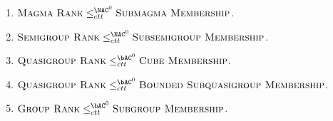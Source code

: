 \documentclass{article}
\begin{document}
\begin{lemma}\label{lem:ranktomem}
  \mbox{}
  \begin{enumerate}
  \item $\textsc{Magma Rank} \leq^{\NAC^0}_{ctt} \textsc{Submagma Membership}$.
  \item $\textsc{Semigroup Rank} \leq^{\NAC^0}_{ctt} \textsc{Subsemigroup Membership}$.
  \item $\textsc{Quasigroup Rank} \leq^{\bAC^0}_{ctt} \textsc{Cube Membership}$.
  \item $\textsc{Quasigroup Rank} \leq^{\bAC^0}_{ctt} \textsc{Bounded Subquasigroup Membership}$.
  \item $\textsc{Group Rank} \leq^{\bAC^0}_{ctt} \textsc{Subgroup Membership}$.
  \end{enumerate}
\end{lemma}
\end{document}
